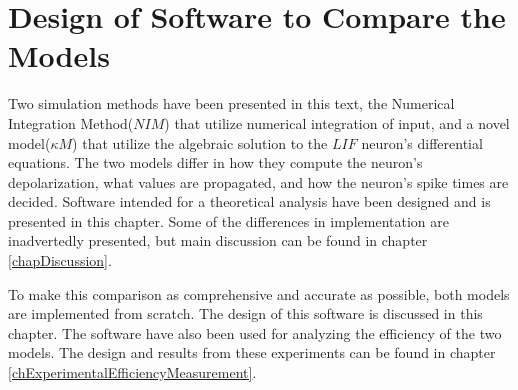 \documentclass[b5paper,12 pt]{report}
\begin{document}
	\chapter{Design of Software to Compare the Models}

		Two simulation methods have been presented in this text,
			the Numerical Integration Method($NIM$) that utilize numerical integration of input,
			and a novel model($\kappa M$) that utilize the algebraic solution to the $LIF$ neuron's differential equations.
		The two models differ in how they compute the neuron's depolarization, what values are propagated, and how the neuron's spike times are decided.
		Software intended for a theoretical analysis have been designed and is presented in this chapter.
		Some of the differences in implementation are inadvertedly presented, but main discussion can be found in chapter \ref{chapDiscussion}.

		To make this comparison as comprehensive and accurate as possible, both models are implemented from scratch.
		The design of this software is discussed in this chapter.
		The software have also been used for analyzing the efficiency of the two models.
		The design and results from these experiments can be found in chapter \ref{chExperimentalEfficiencyMeasurement}.
		
\end{document}
